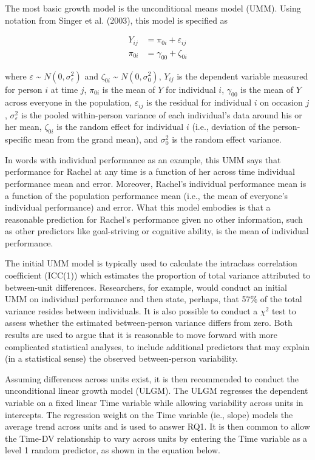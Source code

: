 \documentclass[english,,man]{apa6}
\theoremstyle{definition}
\theoremstyle{definition}
\theoremstyle{definition}
\theoremstyle{remark}
\begin{document}
The most basic growth model is the unconditional means model (UMM).
Using notation from Singer et al. (2003), this model is specified as

\begin{align}
\label{UMM}
Y_{ij} &= \pi_{0i} + \varepsilon_{ij} \\
\pi_{0i} &= \gamma_{00} + \zeta_{0i}
\end{align}

\noindent where \(\varepsilon\) \textasciitilde{}
\(N(0, \sigma_{\varepsilon}^2)\) and \(\zeta_{0i}\) \textasciitilde{}
\(N(0, \sigma_{0}^2)\), \(Y_{ij}\) is the dependent variable measured
for person \(i\) at time \(j\), \(\pi_{0i}\) is the mean of \(Y\) for
individual \(i\), \(\gamma_{00}\) is the mean of \(Y\) across everyone
in the population, \(\varepsilon_{ij}\) is the residual for individual
\(i\) on occasion \(j\), \(\sigma_{\varepsilon}^2\) is the pooled
within-person variance of each individual's data around his or her mean,
\(\zeta_{0i}\) is the random effect for individual \(i\) (i.e.,
deviation of the person-specific mean from the grand mean), and
\(\sigma_0^2\) is the random effect variance.

In words with individual performance as an example, this UMM says that
performance for Rachel at any time is a function of her across time
individual performance mean and error. Moreover, Rachel's individual
performance mean is a function of the population performance mean (i.e.,
the mean of everyone's individual performance) and error. What this
model embodies is that a reasonable prediction for Rachel's performance
given no other information, such as other predictors like goal-striving
or cognitive ability, is the mean of individual performance.

The initial UMM model is typically used to calculate the intraclass
correlation coefficient (ICC(1)) which estimates the proportion of total
variance attributed to between-unit differences. Researchers, for
example, would conduct an initial UMM on individual performance and then
state, perhaps, that 57\% of the total variance resides between
individuals. It is also possible to conduct a \(\chi^2\) test to assess
whether the estimated between-person variance differs from zero. Both
results are used to argue that it is reasonable to move forward with
more complicated statistical analyses, to include additional predictors
that may explain (in a statistical sense) the observed between-person
variability.

Assuming differences across units exist, it is then recommended to
conduct the unconditional linear growth model (ULGM). The ULGM regresses
the dependent variable on a fixed linear Time variable while allowing
variability across units in intercepts. The regression weight on the
Time variable (ie., slope) models the average trend across units and is
used to answer RQ1. It is then common to allow the Time-DV relationship
to vary across units by entering the Time variable as a level 1 random
predictor, as shown in the equation below.
\end{document}
